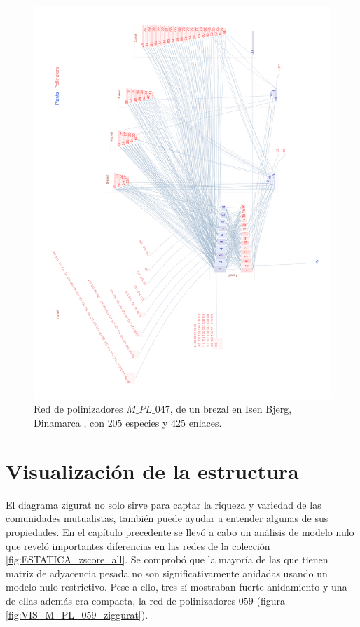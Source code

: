 \clearpage
\begin{figure}[ht!]
\centering
\includegraphics[scale=0.20]{Figures/VIS_M_PL_047_ziggurat.png}
\caption {Red de polinizadores $M\_PL\_047$, de un brezal en Isen Bjerg, Dinamarca \cite{dupont2009ecological}, con $205$ especies y $425$ enlaces.}
\label{fig:VIS_M_PL_047_ziggurat}
\end{figure}


\clearpage
\section{Visualización de la estructura}

El diagrama zigurat no solo sirve para captar la riqueza y variedad de las comunidades mutualistas, también puede ayudar a entender algunas de sus propiedades. En el capítulo precedente se llevó a cabo un análisis de modelo nulo que reveló importantes diferencias en las redes de la colección \ref{fig:ESTATICA_zscore_all}. Se comprobó que la mayoría de las que tienen matriz de adyacencia pesada no son significativamente anidadas usando un modelo nulo restrictivo. Pese a ello, tres sí mostraban fuerte anidamiento y una de ellas además era compacta, la red de polinizadores $059$ (figura \ref{fig:VIS_M_PL_059_ziggurat}).

